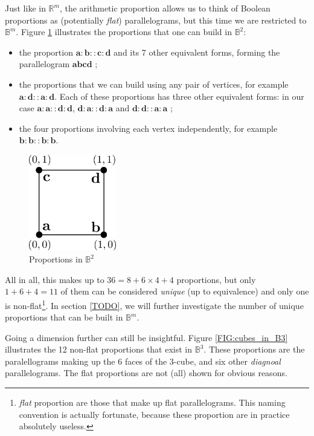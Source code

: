 Just like in $\mathbb{R}^m$, the arithmetic proportion allows us to think of
Boolean proportions as (potentially \textit{flat}) parallelograms, but this
time we are restricted to $\mathbb{B}^m$. Figure \ref{FIG:proportions_in_B2}
illustrates the proportions that one can build in $\mathbb{B}^2$:
\begin{itemize}
  \item the proportion $\mathbf{a}: \mathbf{b} :: \mathbf{c} : \mathbf{d}$ and
    its 7 other equivalent forms, forming the parallelogram
    $\mathbf{a}\mathbf{b}\mathbf{c}\mathbf{d}$ ;
  \item the proportions that we can build using any pair of vertices, for
    example $\mathbf{a} : \mathbf{d} :: \mathbf{a} : \mathbf{d}$. Each of these
    proportions has three other equivalent forms: in our case $\mathbf{a} :
    \mathbf{a} :: \mathbf{d} : \mathbf{d}$, $\mathbf{d} : \mathbf{a} ::
    \mathbf{d} : \mathbf{a}$ and $\mathbf{d} : \mathbf{d} :: \mathbf{a} :
    \mathbf{a}$ ;
  \item the four proportions involving each vertex independently, for example
    $\mathbf{b}:\mathbf{b}::\mathbf{b}:\mathbf{b}$.
\end{itemize}

\begin{figure}[!h]
\centering
\includegraphics[width=1.5in]{figures/proportions_in_B2.pdf}
  \caption{Proportions in $\mathbb{B}^2$}
\label{FIG:proportions_in_B2}
\end{figure}

All in all, this makes up to $36 = 8 + 6 \times 4 + 4$ proportions, but only $1
+ 6 + 4 = 11$ of them can be considered \textit{unique} (up to equivalence) and
only one is non-flat\footnote{\textit{flat} proportion are those that make up
flat parallelograms. This naming convention is actually fortunate, because
these proportion are in practice absolutely useless.}. In section \ref{TODO},
we will further investigate the number of unique proportions that can be built
in $\mathbb{B}^m$.

Going a dimension further can still be insightful. Figure \ref{FIG:cubes_in_B3}
illustrates the 12 non-flat proportions that exist in $\mathbb{B}^3$. These
proportions are the paralellograms making up the 6 faces of the $3$-cube, and
six other \textit{diagnoal} parallelograms. The flat proportions are not (all)
shown for obvious reasons.

